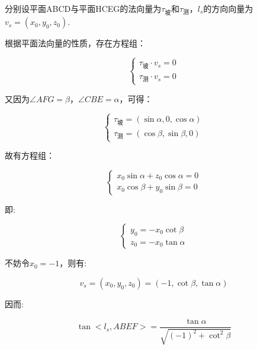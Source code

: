 分别设平面ABCD与平面HCEG的法向量为$\tau_\text{坡}$和$\tau_\text{测}$，$l_s$的方向向量为$v_s = (x_0, y_0, z_0)$.

根据平面法向量的性质，存在方程组：

\begin{equation}
    \begin{cases}
        \tau_\text{坡} \cdot v_s = 0 \\
        \tau_\text{测} \cdot v_s = 0
    \end{cases}
\end{equation}

又因为$\angle AFG=\beta$，$\angle CBE=\alpha$，可得：

\begin{equation}
    \begin{cases}
        \tau_\text{坡} = (\sin\alpha, 0, \cos\alpha) \\
        \tau_\text{测} = (\cos\beta, \sin\beta, 0)
    \end{cases}
\end{equation}

故有方程组：

\begin{equation}
    \begin{cases}
        x_0\sin\alpha + z_0\cos\alpha = 0 \\
        x_0\cos\beta + y_0 \sin\beta = 0
    \end{cases}
\end{equation}

即:

\begin{equation*}
    \begin{cases}
        y_0 = -x_0 \cot \beta \\
        z_0 = -x_0 \tan \alpha
    \end{cases}
\end{equation*}

不妨令$x_0 = -1$，则有:

\begin{equation}
    v_s 
    = (x_0, y_0, z_0)
    = \left( 
            -1,
            \cot \beta,
            \tan \alpha
      \right)
\end{equation}

因而:

\begin{equation*}
    \tan <l_s, ABEF> 
    = \frac {\tan \alpha} {\sqrt{(-1)^2 + \cot ^2 \beta}}
\end{equation*}

